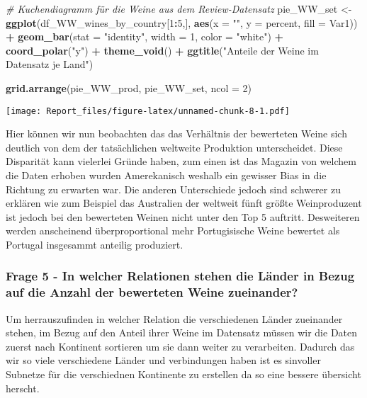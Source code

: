\documentclass[
]{article}
\newenvironment{Shaded}{\begin{snugshade}}{\end{snugshade}}
\newcommand{\AttributeTok}[1]{\textcolor[rgb]{0.13,0.29,0.53}{#1}}
\newcommand{\CommentTok}[1]{\textcolor[rgb]{0.56,0.35,0.01}{\textit{#1}}}
\newcommand{\DecValTok}[1]{\textcolor[rgb]{0.00,0.00,0.81}{#1}}
\newcommand{\FunctionTok}[1]{\textcolor[rgb]{0.13,0.29,0.53}{\textbf{#1}}}
\newcommand{\NormalTok}[1]{#1}
\newcommand{\OtherTok}[1]{\textcolor[rgb]{0.56,0.35,0.01}{#1}}
\newcommand{\SpecialCharTok}[1]{\textcolor[rgb]{0.81,0.36,0.00}{\textbf{#1}}}
\newcommand{\StringTok}[1]{\textcolor[rgb]{0.31,0.60,0.02}{#1}}
\begin{document}
\begin{Shaded}
\begin{Highlighting}[]
\CommentTok{\# Kuchendiagramm für die Weine aus dem Review{-}Datensatz}
\NormalTok{pie\_WW\_set }\OtherTok{\textless{}{-}} \FunctionTok{ggplot}\NormalTok{(df\_WW\_wines\_by\_country[}\DecValTok{1}\SpecialCharTok{:}\DecValTok{5}\NormalTok{,], }\FunctionTok{aes}\NormalTok{(}\AttributeTok{x =} \StringTok{""}\NormalTok{, }\AttributeTok{y =}\NormalTok{ percent, }\AttributeTok{fill =}\NormalTok{ Var1)) }\SpecialCharTok{+}
  \FunctionTok{geom\_bar}\NormalTok{(}\AttributeTok{stat =} \StringTok{"identity"}\NormalTok{, }\AttributeTok{width =} \DecValTok{1}\NormalTok{, }\AttributeTok{color =} \StringTok{"white"}\NormalTok{) }\SpecialCharTok{+}
  \FunctionTok{coord\_polar}\NormalTok{(}\StringTok{"y"}\NormalTok{) }\SpecialCharTok{+}
  \FunctionTok{theme\_void}\NormalTok{() }\SpecialCharTok{+}
  \FunctionTok{ggtitle}\NormalTok{(}\StringTok{"Anteile der Weine im Datensatz je Land"}\NormalTok{)}

\FunctionTok{grid.arrange}\NormalTok{(pie\_WW\_prod, pie\_WW\_set, }\AttributeTok{ncol =} \DecValTok{2}\NormalTok{)}
\end{Highlighting}
\end{Shaded}

\texttt{[image: Report\_files/figure-latex/unnamed-chunk-8-1.pdf]}

Hier können wir nun beobachten das das Verhältnis der bewerteten Weine
sich deutlich von dem der tatsächlichen weltweite Produktion
unterscheidet. Diese Disparität kann vielerlei Gründe haben, zum einen
ist das Magazin von welchem die Daten erhoben wurden Amerekanisch
weshalb ein gewisser Bias in die Richtung zu erwarten war. Die anderen
Unterschiede jedoch sind schwerer zu erklären wie zum Beispiel das
Australien der weltweit fünft größte Weinproduzent ist jedoch bei den
bewerteten Weinen nicht unter den Top 5 auftritt. Desweiteren werden
anscheinend überproportional mehr Portugisische Weine bewertet als
Portugal insgesammt anteilig produziert.

\subsubsection{Frage 5 - In welcher Relationen stehen die Länder in
Bezug auf die Anzahl der bewerteten Weine
zueinander?}\label{frage-5---in-welcher-relationen-stehen-die-luxe4nder-in-bezug-auf-die-anzahl-der-bewerteten-weine-zueinander}

Um herrauszufinden in welcher Relation die verschiedenen Länder
zueinander stehen, im Bezug auf den Anteil ihrer Weine im Datensatz
müssen wir die Daten zuerst nach Kontinent sortieren um sie dann weiter
zu verarbeiten. Dadurch das wir so viele verschiedene Länder und
verbindungen haben ist es sinvoller Subnetze für die verschiednen
Kontinente zu erstellen da so eine bessere übersicht herscht.
\end{document}
